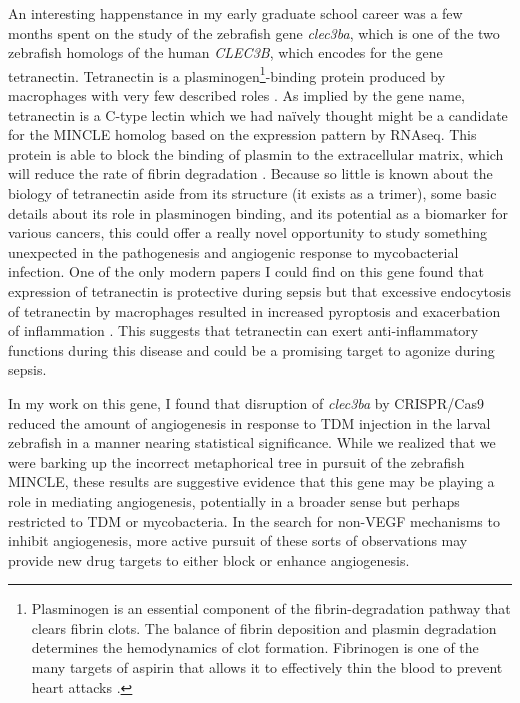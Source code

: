 An interesting happenstance in my early graduate school career was a few months spent on the study of the zebrafish gene \textit{clec3ba}, which is one of the two zebrafish homologs of the human \textit{CLEC3B}, which encodes for the gene tetranectin. Tetranectin is a plasminogen\footnote{Plasminogen is an essential component of the fibrin-degradation pathway that clears fibrin clots. The balance of fibrin deposition and plasmin degradation determines the hemodynamics of clot formation. Fibrinogen is one of the many targets of aspirin that allows it to effectively thin the blood to prevent heart attacks \citep{Bjornsson1989, Keragala2021}.}-binding protein produced by macrophages with very few described roles \citep{Nielsen1993}. As implied by the gene name, tetranectin is a C-type lectin which we had na\"{i}vely thought might be a candidate for the MINCLE homolog based on the expression pattern by RNAseq. This protein is able to block the binding of plasmin to the extracellular matrix, which will reduce the rate of fibrin degradation \citep{Mogues2004}. Because so little is known about the biology of tetranectin aside from its structure (it exists as a trimer), some basic details about its role in plasminogen binding, and its potential as a biomarker for various cancers, this could offer a really novel opportunity to study something unexpected in the pathogenesis and angiogenic response to mycobacterial infection. One of the only modern papers I could find on this gene found that expression of tetranectin is protective during sepsis but that excessive endocytosis of tetranectin by macrophages resulted in increased pyroptosis and exacerbation of inflammation \citep{Chen2020}. This suggests that tetranectin can exert anti-inflammatory functions during this disease and could be a promising target to agonize during sepsis.

In my work on this gene, I found that disruption of \textit{clec3ba} by CRISPR/Cas9 reduced the amount of angiogenesis in response to TDM injection in the larval zebrafish in a manner nearing statistical significance. While we realized that we were barking up the incorrect metaphorical tree in pursuit of the zebrafish MINCLE, these results are suggestive evidence that this gene may be playing a role in mediating angiogenesis, potentially in a broader sense but perhaps restricted to TDM or mycobacteria. In the search for non-VEGF mechanisms to inhibit angiogenesis, more active pursuit of these sorts of observations may provide new drug targets to either block or enhance angiogenesis. 

